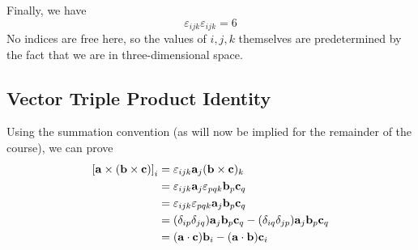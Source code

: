 Finally, we have
\[
	\varepsilon_{ijk}\varepsilon_{ijk} = 6
\]
No indices are free here, so the values of \(i, j, k\) themselves are predetermined by the fact that we are in three-dimensional space.

\subsection{Vector Triple Product Identity}
Using the summation convention (as will now be implied for the remainder of the course), we can prove
\begin{align*}
	\left[ \vb a \times (\vb b \times \vb c) \right]_i
	 & = \varepsilon_{ijk} \vb a_j (\vb b \times \vb c)_k                                                  \\
	 & = \varepsilon_{ijk} \vb a_j \varepsilon_{pqk} \vb b_p \vb c_q                                       \\
	 & = \varepsilon_{ijk}\varepsilon_{pqk} \vb a_j \vb b_p \vb c_q                                        \\
	 & = (\delta_{ip}\delta_{jq})\vb a_j \vb b_p \vb c_q - (\delta_{iq}\delta_{jp})\vb a_j \vb b_p \vb c_q \\
	 & = (\vb a \cdot \vb c) \vb b_i - (\vb a \cdot \vb b) \vb c_i
\end{align*}
